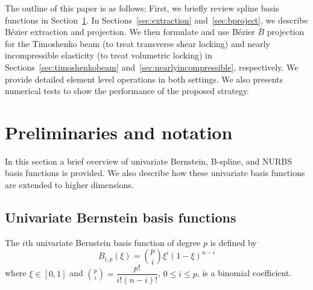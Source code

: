 \documentclass{article}
\begin{document}
The outline of this paper is as follows: First, we briefly review spline basis functions in Section~\ref{sec:preliminaries}. In Sections~\ref{sec:extraction} and~\ref{sec:bproject}, we describe B\'ezier extraction and projection. We then formulate and use B\'ezier $\bar{B}$ projection for the Timoshenko beam (to treat transverse shear locking) and nearly incompressible elasticity (to treat volumetric locking) in Sections~\ref{sec:timoshenkobeam} and~\ref{sec:nearlyincompressible}, respectively. We provide detailed element level operations in both settings. We also presents numerical tests to show the performance of the proposed strategy. %

\section{Preliminaries and notation}
\label{sec:preliminaries}
In this section a brief overview of univariate Bernstein, B-spline, and NURBS basis functions is provided. We also describe how these univariate basis functions are extended to higher dimensions.
\subsection{Univariate Bernstein basis functions}
The $i$th univariate Bernstein basis function of degree $p$ is defined by
\begin{equation}
B_{i,p}(\xi)=\binom {p}{i}\xi^i(1-\xi)^{n-i}
\end{equation}
where $\xi\in\left[ 0,1 \right]$ and $\binom {p}{i}=\dfrac{p!}{i!(n-i)!}$, $0\leq{i}\leq{p}$, is a binomial coefficient.
\end{document}
